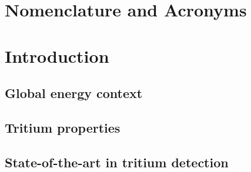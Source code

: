 \documentclass[12pt,a4paper]{book}
\begin{document}
\chapter*{Nomenclature and Acronyms} \label{chap:NomenclatureAcronyms}  %
{} %


\let\OLDthebibliography=\thebibliography
\def\thebibliography#1{\OLDthebibliography{#1}%
\addcontentsline{toc}{chapter}{\bibname}}

\tableofcontents

\listoffigures

{} %

\listoftables

{} %




\chapter{Introduction}  \label{chap:GeneralIntroduction} %
	\section{Global energy context}
	 \label{sec:Introduction}
	\newpage

	\section{Tritium properties}
	\label{sec:TritiumProperties}
	\newpage
	
	\section{State-of-the-art in tritium detection}
	\label{sec:StateOfTheArt}
	\newpage
	
\end{document}
